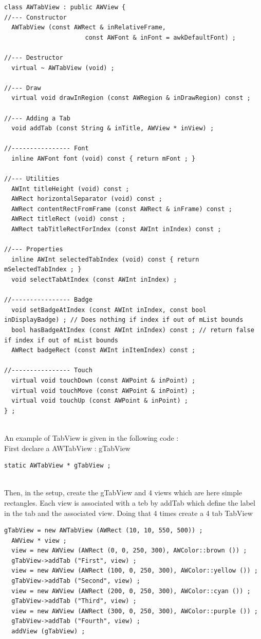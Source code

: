 \documentclass[a4paper,11pt]{extarticle}
\begin{document}
\begin{lstlisting}[language=Arduinonl]
class AWTabView : public AWView {
//--- Constructor
  AWTabView (const AWRect & inRelativeFrame,
                      const AWFont & inFont = awkDefaultFont) ;

//--- Destructor
  virtual ~ AWTabView (void) ;

//--- Draw
  virtual void drawInRegion (const AWRegion & inDrawRegion) const ;

//--- Adding a Tab
  void addTab (const String & inTitle, AWView * inView) ;

//---------------- Font
  inline AWFont font (void) const { return mFont ; }

//--- Utilities
  AWInt titleHeight (void) const ;
  AWRect horizontalSeparator (void) const ;
  AWRect contentRectFromFrame (const AWRect & inFrame) const ;
  AWRect titleRect (void) const ;
  AWRect tabTitleRectForIndex (const AWInt inIndex) const ;

//--- Properties
  inline AWInt selectedTabIndex (void) const { return mSelectedTabIndex ; }
  void selectTabAtIndex (const AWInt inIndex) ;

//---------------- Badge
  void setBadgeAtIndex (const AWInt inIndex, const bool inDisplayBadge) ; // Does nothing if index if out of mList bounds
  bool hasBadgeAtIndex (const AWInt inIndex) const ; // return false if index if out of mList bounds
  AWRect badgeRect (const AWInt inItemIndex) const ;

//---------------- Touch
  virtual void touchDown (const AWPoint & inPoint) ;
  virtual void touchMove (const AWPoint & inPoint) ;
  virtual void touchUp (const AWPoint & inPoint) ;
} ;
\end{lstlisting}

~\\ An example of TabView is given in the following code :
~\\ First declare a AWTabView : gTabView

\begin{lstlisting}[language=Arduinonl]
static AWTabView * gTabView ;
\end{lstlisting}

~\\ Then, in the setup, create the gTabView and 4 views which are here simple rectangles. Each view is associated with a teb by addTab which define the label in the tab and the associated view. Doing that 4 times create a 4 tab TabView

\begin{lstlisting}[language=Arduinonl]
  gTabView = new AWTabView (AWRect (10, 10, 550, 500)) ;
  AWView * view ;
  view = new AWView (AWRect (0, 0, 250, 300), AWColor::brown ()) ;
  gTabView->addTab ("First", view) ;
  view = new AWView (AWRect (100, 0, 250, 300), AWColor::yellow ()) ;
  gTabView->addTab ("Second", view) ;
  view = new AWView (AWRect (200, 0, 250, 300), AWColor::cyan ()) ;
  gTabView->addTab ("Third", view) ;
  view = new AWView (AWRect (300, 0, 250, 300), AWColor::purple ()) ;
  gTabView->addTab ("Fourth", view) ;
  addView (gTabView) ;
\end{lstlisting}
\end{document}
